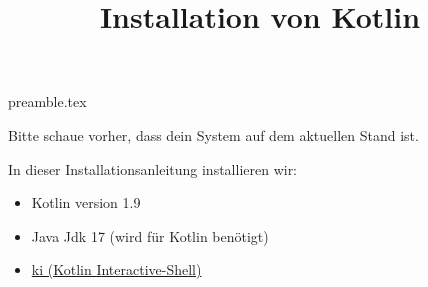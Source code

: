 \RequirePackage{import}
{preamble.tex}
\usepackage{hyperref}
\title{Installation von Kotlin}


\maketitle

Bitte schaue vorher, dass dein System auf dem aktuellen Stand ist.

In dieser Installationsanleitung installieren wir:
\begin{itemize}
    \item Kotlin version 1.9
    \item Java Jdk 17 (wird für Kotlin benötigt)
    \item \href{https://github.com/Kotlin/kotlin-interactive-shell}{ki (\underline{K}otlin \underline{I}nteractive-Shell)}
\end{itemize}
